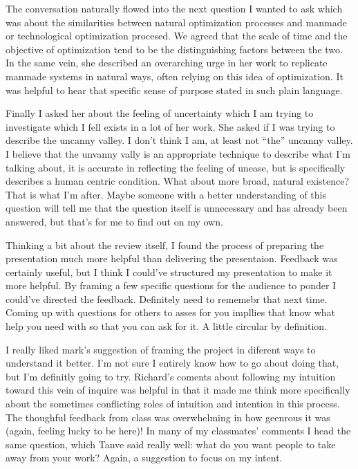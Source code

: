 \documentclass[11pt]{report}
\begin{document}
The conversation naturally flowed into the next question I wanted to ask which was about the similarities between natural optimization processes and manmade or technological optimization procesed. We agreed that the scale of time and the objective of optimization tend to be the distinguishing factors between the two. In the same vein, she described an overarching urge in her work to replicate manmade systems in natural ways, often relying on this idea of optimization. It was helpful to hear that specific sense of purpose stated in such plain language.

Finally I asked her about the feeling of uncertainty which I am trying to investigate which I fell exists in a lot of her work. She asked if I was trying to describe the uncanny valley. I don't think I am, at least not ``the'' uncanny valley. I believe that the unvanny vally is an appropriate technique to describe what I'm talking about, it is accurate in reflecting the feeling of unease, but is specifically describes a human centric condition. What about more broad, natural existence? That is what I'm after. Maybe someone with a better understanding of this question will tell me that the question itself is unnecessary and has already been answered, but that's for me to find out on my own. 

Thinking a bit about the review itself, I found the process of preparing the presentation much more helpful than delivering the presentaion. Feedback was certainly useful, but I think I could've structured my presentation to make it more helpful. By framing a few specific questions for the audience to ponder I could've directed the feedback. Definitely need to rememebr that next time. Coming up with questions for others to asses for you impllies that know what help you need with so that you can ask for it. A little circular by definition. 

I really liked mark's suggestion of framing the project in diferent ways to understand it better. I'm not sure I entirely know how to go about doing that, but I'm definitly going to try. Richard's coments about following my intuition toward this vein of inquire was helpful in that it made me think more specifically about the sometimes conflicting roles of intuition and intention in this process. The thoughful feedback from class was overwhelming in how geenrous it was (again, feeling lucky to be here)! In many of my classmates' comments I head the same question, which Tanve said really well: what do you want people to take away from your work? Again, a suggestion to focus on my intent.
\end{document}
